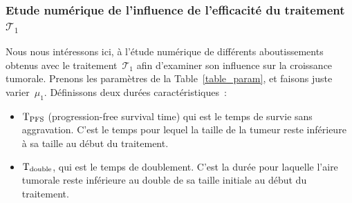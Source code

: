 \documentclass[11pt]{amsart}
\numberwithin{equation}{section}
\newcommand{\TI}{{\mathcal T_1}}
\newcommand{\TPFS}{{\rm T_{PFS}}}
\newcommand{\Td}{{\rm T_{double}}}
\newcommand{\muI}{\mu_1}
\begin{document}
\subsubsection{Etude numérique de l'influence de l'efficacité du traitement~$\TI$}\label{subsec:NumEff}
Nous nous intéressons ici, à l'étude numérique de différents aboutissements obtenus avec le 
traitement~$\TI$ afin d'examiner son influence sur la croissance tumorale. 
Prenons les paramètres de la Table~\ref{table_param}, et faisons juste varier~$\muI$. 
Définissons deux durées caractéristiques~:
\begin{itemize}
\item $\TPFS$ (progression-free survival time) qui est le temps de survie sans aggravation. C'est le temps pour lequel la taille de la tumeur reste inférieure à sa taille au début du traitement.  
\item $\Td$, qui est le temps de doublement. C'est la durée pour laquelle l'aire tumorale reste inférieure au double de sa taille initiale au début du traitement. 
\end{itemize}
\end{document}
